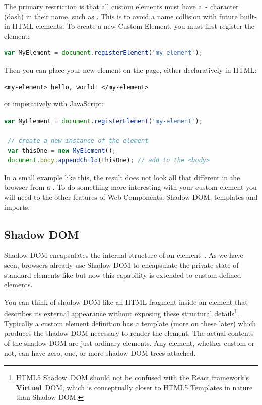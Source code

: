 The primary restriction is that all custom elements must have a \texttt{-} character (dash) in their name, such as . 
This is to avoid a name collision with future built-in HTML elements. 
To create a new Custom Element, you must first register the element:

\begin{lstlisting}[language=JavaScript,numbers=none]
 var MyElement = document.registerElement('my-element');
\end{lstlisting}

Then you can place your new element on the page, either declaratively in HTML:

\begin{lstlisting}[language=HTML5,numbers=none]
 <my-element> hello, world! </my-element>
\end{lstlisting}

or imperatively with JavaScript:

\begin{lstlisting}[language=JavaScript,caption={Registering a custom element\index{Custom Element} in JavaScript\index{JavaScript}.},label=l:register]
 var MyElement = document.registerElement('my-element');

 // create a new instance of the element
 var thisOne = new MyElement();      
 document.body.appendChild(thisOne); // add to the <body>
\end{lstlisting}

In a small example like this, the result does not look all that different in the browser from a .
To do something more interesting with your custom element you will need to the other features of Web Components: Shadow DOM, templates and imports.

\subsection{Shadow DOM}
\label{bg:shadowdom}
Shadow DOM encapsulates the internal structure of an element~\cite{w3ccontributors2015}. 
As we have seen, browsers already use Shadow DOM to encapsulate the private state of standard elements like  but now this capability is extended to custom-defined elements.

You can think of shadow DOM like an HTML fragment inside an element that describes its external appearance without exposing these structural details\footnote{
HTML5 Shadow~DOM should not be confused with the React framework's \textbf{Virtual}~DOM, which is conceptually closer to HTML5 Templates in nature than Shadow DOM.}. 
Typically a custom element definition has a template (more on these later) which produces the shadow DOM necessary to render the element.
The actual contents of the shadow DOM are just ordinary elements.
Any element, whether custom or not, can have zero, one, or more shadow DOM trees attached.

